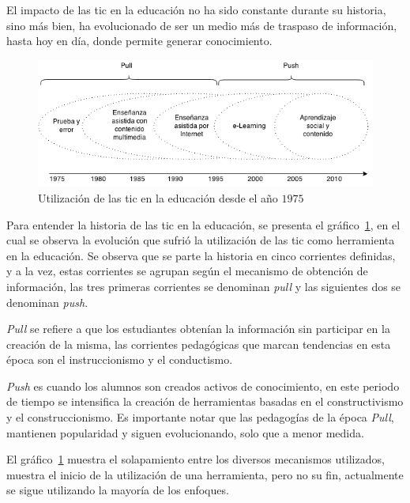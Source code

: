 El impacto de las \Gls{tic} en la educación no ha sido constante durante su
historia, sino más bien, ha evolucionado de ser un medio más de traspaso de
información, hasta hoy en día, donde permite generar
conocimiento\cite{tinio:ict}.

\begin{figure}
\centering
\includegraphics[scale=0.75]{tics/images/tics_history.png}
\caption{Utilización de las \Gls{tic} en la educación desde el año $1975$}
\label{fig:history_tics}
\end{figure}

Para entender la historia de las \Gls{tic} en la educación, se presenta el
gráfico~\ref{fig:history_tics}, en el cual se observa la evolución que sufrió la
utilización de las \Gls{tic} como herramienta en la educación. Se observa que se
parte la historia en cinco corrientes definidas, y a la vez, estas corrientes se
agrupan según el mecanismo de obtención de información, las tres primeras
corrientes se denominan \textit{pull} y las siguientes dos se denominan
\textit{push}. 

\textit{Pull} se refiere a que los estudiantes obtenían la
información sin participar en la creación de la misma, las corrientes
pedagógicas que marcan tendencias en esta época son el instruccionismo y el
conductismo\cite{white:ict}.

\textit{Push} es cuando los alumnos son creados activos de
conocimiento\cite{white:ict,leinonen:ict}, en este periodo de tiempo se
intensifica la creación de herramientas basadas en el constructivismo y el
construccionismo. Es importante notar que las pedagogías de la época
\textit{Pull}, mantienen popularidad y siguen evolucionando, solo que a menor
medida\cite{white:ict}.

El gráfico~\ref{fig:history_tics} muestra el solapamiento entre los diversos
mecanismos utilizados, muestra el inicio de la utilización de una herramienta,
pero no su fin, actualmente se sigue utilizando la mayoría de los
enfoques\cite{leinonen:ict}.

